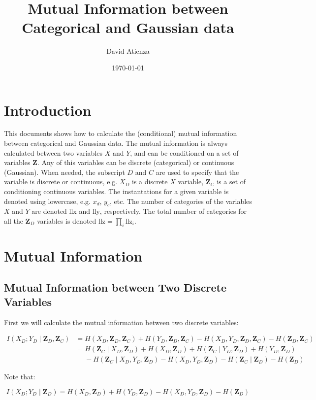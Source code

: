 \documentclass[12pt]{article}
\title{Mutual Information between Categorical and Gaussian data}
\author{David Atienza}
\date{\today}
\newcommand{\zd}{\mathbf{Z}_D}
\newcommand{\zc}{\mathbf{Z}_C}
\newcommand{\z}{\mathbf{Z}_D, \mathbf{Z}_C}
\begin{document}
\maketitle


\section{Introduction}

This documents shows how to calculate the (conditional) mutual information between categorical and Gaussian data. The mutual information is always calculated between two variables $X$ and $Y$, and can be conditioned on a set of variables $\mathbf{Z}$. Any of this variables can be discrete (categorical) or continuous (Gaussian). When needed, the subscript $D$ and $C$ are used to specify that the variable is discrete or continuous, e.g. $X_{D}$ is a discrete $X$ variable, $\mathbf{Z}_C$ is a set of conditioning continuous variables. The instantations for a given variable is denoted using lowercase, e.g. $x_d$, $y_c$, etc. The number of categories of the variables $X$ and $Y$ are denoted $\text{llx}$ and $\text{lly}$, respectively. The total number of categories for all the $\zd$ variables is denoted $\text{llz} = \prod_i \text{llz}_{i}$.

\section{Mutual Information}

\subsection{Mutual Information between Two Discrete Variables}

First we will calculate the mutual information between two discrete variables:

\begin{equation}
\begin{aligned}
I(X_D; Y_D \mid \z) & = H(X_D, \z) + H(Y_D, \z) - H(X_D, Y_D, \z) - H(\z)\\
& = H(\zc \mid X_D, \zd) + H(X_D, \zd) + H(\zc\mid Y_D, \zd) + H(Y_D, \zd)\\
&\phantom{ = }{}- H(\zc \mid X_D, Y_D, \zd) - H(X_D, Y_D, \zd) - H(\zc \mid \zd) - H(\zd)
\end{aligned}
\end{equation}

Note that:

\begin{equation}
I(X_D; Y_D \mid \zd) = H(X_D, \zd) + H(Y_D, \zd) - H(X_D, Y_D, \zd) - H(\zd)
\end{equation}
\end{document}
